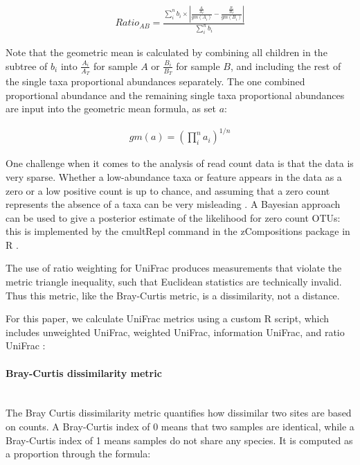 \documentclass[10pt,letterpaper]{article}
\begin{document}
\begin{align*}
Ratio_{AB} = \frac{\sum_{i}^{n} b_{i} \times \left| \frac{\frac{A_{i}}{A_{T}}}{gm(A_{i})} - \frac{\frac{B_{i}}{B_{T}}}{{gm(B_{i})}} \right|}{\sum_{i}^{n} b_{i}}
\end{align*}

Note that the geometric mean is calculated by combining all children in the subtree of $b_{i}$ into $\frac{A_{i}}{A_{T}}$ for sample $A$ or $\frac{B_{i}}{B_{T}}$ for sample $B$, and including the rest of the single taxa proportional abundances separately. The one combined proportional abundance and the remaining single taxa proportional abundances are input into the geometric mean formula, as set $a$:

\begin{align*}
gm(a) = \left( \prod_{i}^{n} a_{i}\right)^{1/n}
\end{align*}

One challenge when it comes to the analysis of read count data is that the data is very sparse. Whether a low-abundance taxa or feature appears in the data as a zero or a low positive count is up to chance, and assuming that a zero count represents the absence of a taxa can be very misleading \cite{fernandes2013anova}. A Bayesian approach can be used to give a posterior estimate of the likelihood for zero count OTUs: this is implemented by the cmultRepl command in the zCompositions package in R \cite{palarea2015zcompositions}.

The use of ratio weighting for UniFrac produces measurements that violate the metric triangle inequality, such that Euclidean statistics are technically invalid. Thus this metric, like the Bray-Curtis metric, is a dissimilarity, not a distance.

For this paper, we calculate UniFrac metrics using a custom R script, which includes unweighted UniFrac, weighted UniFrac, information UniFrac, and ratio UniFrac \cite{ruth_unifrac_workshop}:

\paragraph{Bray-Curtis dissimilarity metric}\mbox{}\\
The Bray Curtis dissimilarity metric \cite{beals1984bray} quantifies how dissimilar two sites are based on counts. A Bray-Curtis index of 0 means that two samples are identical, while a Bray-Curtis index of 1 means samples do not share any species. It is computed as a proportion through the formula:
\end{document}
